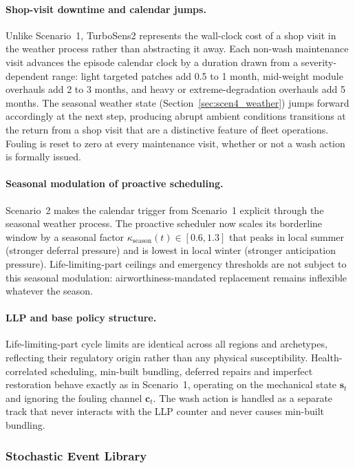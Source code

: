 \paragraph{Shop-visit downtime and calendar jumps.}
Unlike Scenario~1, TurboSens2 represents the wall-clock cost of a
shop visit in the weather process rather than abstracting it away.
Each non-wash maintenance visit advances the episode calendar clock
by a duration drawn from a severity-dependent range: light targeted
patches add 0.5 to 1 month, mid-weight module overhauls add 2 to 3
months, and heavy or extreme-degradation overhauls add 5 months.
The seasonal weather state (Section~\ref{sec:scen4_weather}) jumps
forward accordingly at the next step, producing abrupt ambient
conditions transitions at the return from a shop visit that are a
distinctive feature of fleet operations. Fouling is reset to
zero at every maintenance visit, whether or not a wash action is
formally issued.

\paragraph{Seasonal modulation of proactive scheduling.}
Scenario~2 makes the calendar trigger from Scenario~1 explicit through
the seasonal weather process. The proactive scheduler now scales its
borderline window by a seasonal factor
$\kappa_\mathrm{season}(t) \in [0.6, 1.3]$ that peaks in local summer
(stronger deferral pressure) and is lowest in local winter
(stronger anticipation pressure). Life-limiting-part ceilings and
emergency thresholds are not subject to this seasonal modulation:
airworthiness-mandated replacement remains inflexible whatever the
season.

\paragraph{LLP and base policy structure.}
Life-limiting-part cycle limits are identical across all regions and
archetypes, reflecting their regulatory origin rather than any physical
susceptibility. Health-correlated scheduling, min-built bundling,
deferred repairs and imperfect restoration behave exactly as in Scenario~1,
operating on the mechanical state $\mathbf{s}_t$ and ignoring the
fouling channel $\mathbf{c}_t$. The wash action is handled as a
separate track that never interacts with the LLP counter and never
causes min-built bundling.

\subsubsection{Stochastic Event Library}
\label{sec:scen4_events}

